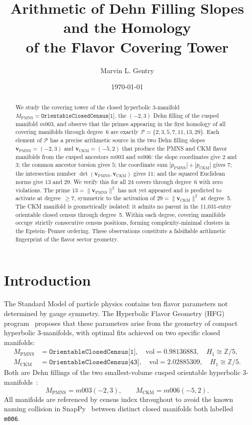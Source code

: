 \documentclass[12pt]{article}
\title{Arithmetic of Dehn Filling Slopes and the Homology\\
of the Flavor Covering Tower}
\author{Marvin L. Gentry}
\affil{Independent Researcher, Seattle, WA\\
\texttt{drmlgentry@protonmail.com}\\
ORCID: 0009-0006-4550-2663}
\date{\today}
\theoremstyle{definition}
\begin{document}
\maketitle

\begin{abstract}
We study the covering tower of the closed hyperbolic 3-manifold
$M_{\mathrm{PMNS}} = \texttt{OrientableClosedCensus[1]}$, the $(-2,3)$
Dehn filling of the cusped manifold $m003$, and observe that the primes
appearing in the first homology of all covering manifolds through degree~6
are exactly $\mathcal{P} = \{2,3,5,7,11,13,29\}$. Each element of
$\mathcal{P}$ has a precise arithmetic source in the two Dehn filling
slopes $\mathbf{v}_{\mathrm{PMNS}} = (-2,3)$ and
$\mathbf{v}_{\mathrm{CKM}} = (-5,2)$ that produce the PMNS and CKM
flavor manifolds from the cusped ancestors $m003$ and $m006$: the slope
coordinates give $2$ and $3$; the common ancestor torsion gives $5$;
the coordinate sum $|p_{\mathrm{PMNS}}| + |p_{\mathrm{CKM}}|$ gives
$7$; the intersection number
$\det(\mathbf{v}_{\mathrm{PMNS}}, \mathbf{v}_{\mathrm{CKM}})$ gives
$11$; and the squared Euclidean norms give $13$ and $29$.
We verify this for all 24 covers through degree~6 with zero violations.
The prime $13 = \|\mathbf{v}_{\mathrm{PMNS}}\|^2$ has not yet appeared
and is predicted to activate at degree~$\geq 7$, symmetric to the
activation of $29 = \|\mathbf{v}_{\mathrm{CKM}}\|^2$ at degree~5.
The CKM manifold is geometrically isolated: it admits no parent in the
11,031-entry orientable closed census through degree~5.
Within each degree, covering manifolds occupy strictly consecutive
census positions, forming complexity-minimal clusters in the
Epstein--Penner ordering.
These observations constitute a falsifiable arithmetic fingerprint of
the flavor sector geometry.
\end{abstract}

\section{Introduction}

The Standard Model of particle physics contains ten flavor parameters
not determined by gauge symmetry. The Hyperbolic Flavor Geometry (HFG)
program~\cite{Gentry:CKM,Gentry:PMNS,Gentry:CP,Gentry:Twist} proposes
that these parameters arise from the geometry of compact hyperbolic
3-manifolds, with optimal fits achieved on two specific closed manifolds:
\begin{align*}
  M_{\mathrm{PMNS}} &= \texttt{OrientableClosedCensus[1]},\quad
    \mathrm{vol} = 0.98136883,\quad H_1 \cong \mathbb{Z}/5, \\
  M_{\mathrm{CKM}}  &= \texttt{OrientableClosedCensus[43]},\quad
    \mathrm{vol} = 2.02885309,\quad H_1 \cong \mathbb{Z}/5.
\end{align*}
Both are Dehn fillings of the two smallest-volume cusped orientable
hyperbolic 3-manifolds~\cite{Thurston}:
\[
  M_{\mathrm{PMNS}} = m003(-2,3), \qquad M_{\mathrm{CKM}} = m006(-5,2).
\]
All manifolds are referenced by census index throughout to avoid the
known naming collision in SnapPy~\cite{SnapPy} between distinct closed
manifolds both labelled \texttt{m006}.
\end{document}
